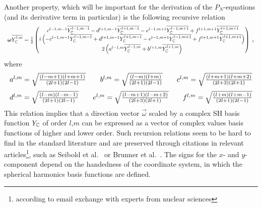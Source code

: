 Another property, which will be important for the derivation of the $P_N$-equations (and its derivative term in particular) is the following recursive relation
\begin{equation}
\label{eq:recursive_relation}
\resizebox{1.0\hsize}{!}{$\vec{\omega}\overline{\SHBC^{l,m}} = \frac{1}{2}
\begin{pmatrix}
\ c^{l-1, m-1}\overline{\SHBC^{l-1,m-1}} - d^{l+1, m-1}\overline{\SHBC^{l+1,m-1}} - e^{l-1, m+1}\overline{\SHBC^{l-1,m+1}} + f^{l+1, m+1}\overline{\SHBC^{l+1,m+1}}\\
i\left(-c^{l-1, m-1}\overline{\SHBC^{l-1,m-1}} + d^{l+1, m-1}\overline{\SHBC^{l+1,m-1}} - e^{l-1, m+1}\overline{\SHBC^{l-1,m+1}} + f^{l+1, m+1}\overline{\SHBC^{l+1,m+1}}\right) \\
2\left(a^{l-1, m}\overline{\SHBC^{l-1,m}}+b^{l+1, m}\overline{\SHBC^{l+1,m}}\right)
\end{pmatrix}$}
\ ,
\end{equation}
where
\begin{equation*}
\resizebox{1.0\hsize}{!}{$
a^{l,m}= \sqrt{\frac{\left(l-m+1\right)\left(l+m+1\right)}{\left(2l+1\right)\left(2l-1\right)}} \qquad
b^{l,m}= \sqrt{\frac{\left(l-m\right)\left(l+m\right)}{\left(2l+1\right)\left(2l-1\right)}} \qquad
c^{l,m}= \sqrt{\frac{\left(l+m+1\right)\left(l+m+2\right)}{\left(2l+3\right)\left(2l+1\right)}}
$}
\end{equation*}
\begin{equation*}
\resizebox{1.0\hsize}{!}{$
d^{l,m}= \sqrt{\frac{\left(l-m\right)\left(l-m-1\right)}{\left(2l+1\right)\left(2l-1\right)}} \qquad
e^{l,m}= \sqrt{\frac{\left(l-m+1\right)\left(l-m+2\right)}{\left(2l+3\right)\left(2l+1\right)}} \qquad
f^{l,m}= \sqrt{\frac{\left(l+m\right)\left(l+m-1\right)}{\left(2l+1\right)\left(2l-1\right)}}
$}
\end{equation*}
This relation implies that a direction vector $\vec{\omega}$ scaled by a complex SH basis function $Y_{\mathbb{C}}$ of order $l$,$m$ can be expressed as a vector of complex values basis functions of higher and lower order. Such recursion relations seem to be hard to find in the standard literature and are preserved through citations in relevant articles\footnote{according to email exchange with experts from nuclear sciences}, such as Seibold et al.~\cite{Seibold14} or Brunner et al.~\cite{Brunner05}. The signs for the $x$- and $y$- component depend on the handedness of the coordinate system, in which the spherical harmonics basis functions are defined.